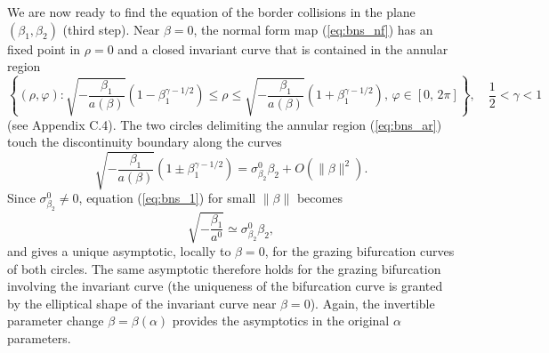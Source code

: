 \documentclass[final,onefignum]{siamltex}
\begin{document}
We are now ready to find the equation of the border collisions in the plane $(\beta_1,\beta_2)$ (third step). Near $\beta=0$, the normal form map (\ref{eq:bns_nf}) has an fixed point in
$\rho=0$ and a closed invariant curve that is contained in the annular region
\begin{equation}
\label{eq:bns_ar}
\left\{(\rho,\varphi):
\sqrt{-{\displaystyle \frac{\displaystyle {\beta_1}}{\displaystyle {a(\beta)}}}}(1-\beta_1^{\gamma-1/2})\le\rho\le
\sqrt{-{\displaystyle \frac{\displaystyle {\beta_1}}{\displaystyle {a(\beta)}}}}(1+\beta_1^{\gamma-1/2}),\,
\varphi\in[0,\,2\pi]\right\},\quad{\displaystyle \frac{\displaystyle {1}}{\displaystyle {2}}}<\gamma<1
\end{equation}
(see Appendix C.4).  The two circles delimiting the annular region (\ref{eq:bns_ar})
touch the discontinuity boundary along the curves
\begin{equation}
\label{eq:bns_1}
\sqrt{-{\displaystyle \frac{\displaystyle {\beta_1}}{\displaystyle {a(\beta)}}}}(1\pm\beta_1^{\gamma-1/2})=
\sigma_{\beta_2}^0\beta_2+O(\|\beta\|^2).
\end{equation}
Since $\sigma_{\beta_2}^0\neq 0$,
equation (\ref{eq:bns_1}) for small $\|\beta\|$ becomes
\begin{equation}
\label{eq:bns_2}
\sqrt{-{\displaystyle \frac{\displaystyle {\beta_1}}{\displaystyle {a^0}}}} \simeq \sigma_{\beta_2}^0\beta_2,
\end{equation}
and gives a unique asymptotic, locally to $\beta=0$, for the grazing
bifurcation curves of both circles. The same asymptotic therefore holds
for the grazing bifurcation involving the invariant curve (the uniqueness of the bifurcation curve is granted by the elliptical shape of the invariant curve near $\beta=0$).
Again, the invertible parameter change $\beta=\beta(\alpha)$ provides the asymptotics in the original $\alpha$ parameters.
\end{document}
